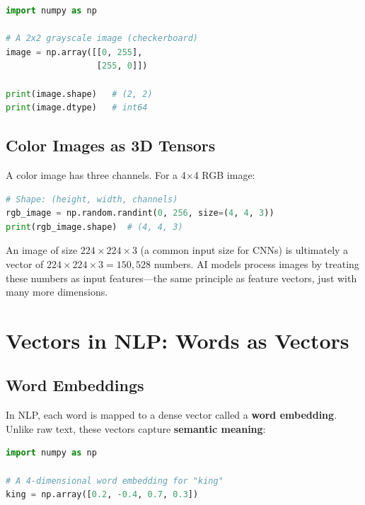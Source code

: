 \documentclass[11pt,a4paper]{article}
\begin{document}
\begin{lstlisting}[language=Python]
import numpy as np

# A 2x2 grayscale image (checkerboard)
image = np.array([[0, 255],
                  [255, 0]])

print(image.shape)   # (2, 2)
print(image.dtype)   # int64
\end{lstlisting}

\subsection{Color Images as 3D Tensors}

A color image has three channels. For a 4$\times$4 RGB image:

\begin{lstlisting}[language=Python]
# Shape: (height, width, channels)
rgb_image = np.random.randint(0, 256, size=(4, 4, 3))
print(rgb_image.shape)  # (4, 4, 3)
\end{lstlisting}

\begin{tcolorbox}[intuitionbox={Key Insight}]
An image of size $224 \times 224 \times 3$ (a common input size for CNNs) is ultimately a vector of $224 \times 224 \times 3 = 150{,}528$ numbers. AI models process images by treating these numbers as input features---the same principle as feature vectors, just with many more dimensions.
\end{tcolorbox}

\section{Vectors in NLP: Words as Vectors}

\subsection{Word Embeddings}

In NLP, each word is mapped to a dense vector called a \textbf{word embedding}. Unlike raw text, these vectors capture \textbf{semantic meaning}:

\begin{lstlisting}[language=Python]
import numpy as np

# A 4-dimensional word embedding for "king"
king = np.array([0.2, -0.4, 0.7, 0.3])
\end{lstlisting}
\end{document}

